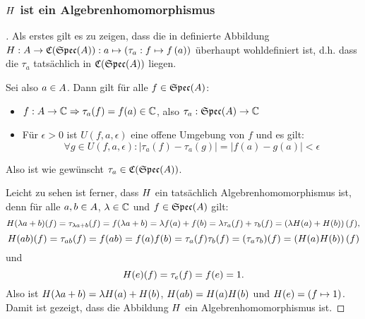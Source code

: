 \subsubsection{$H$ ist ein Algebrenhomomorphismus}\label{sec:Algebrenhomomorphismus}

\begin{proof}[]Als erstes gilt es zu zeigen, dass die in  definierte Abbildung $H: A \to \mathfrak{C}(\mathfrak{Spec}(A)): a \mapsto \left(\tau_a: f \mapsto f\left(a\right)\right)$ überhaupt wohldefiniert ist, d.h. dass die $\tau_a$ tatsächlich in $\mathfrak{C}(\mathfrak{Spec}(A))$ liegen.

Sei also $a \in A$. Dann gilt für alle $f \in \mathfrak{Spec}(A)$:
\begin{itemize}
	\item $f: A \to \mathbb{C} \Rightarrow \tau_a(f) = f(a) \in \mathbb{C}$, also $\tau_a: \mathfrak{Spec}(A) \to \mathbb{C}$
	\item Für $\epsilon > 0$ ist $U(f, a, \epsilon)$ eine offene Umgebung von $f$ und es gilt:
		\[\forall g \in U(f, a, \epsilon): |\tau_a(f) - \tau_a(g)| = |f(a) - g(a)| < \epsilon\]
\end{itemize}
Also ist wie gewünscht $\tau_a \in \mathfrak{C}(\mathfrak{Spec}(A))$.

Leicht zu sehen ist ferner, dass $H$ ein tatsächlich Algebrenhomomorphismus ist, denn für alle $a, b \in A$, $\lambda \in \mathbb{C}$ und $f \in \mathfrak{Spec}(A)$ gilt:
	\[H(\lambda a + b)(f) = \tau_{\lambda a + b}(f) = f(\lambda a + b) = \lambda f(a) + f(b) = \lambda \tau_a(f) + \tau_b(f) = \left(\lambda H(a)+H(b)\right)(f),\]
	\[H(ab)(f) = \tau_{ab}(f) = f(ab) = f(a)f(b) = \tau_a(f)\tau_b(f) = (\tau_a\tau_b)(f) = \left(H(a)H(b)\right)(f)\]
und
	\[H(e)(f) = \tau_e(f) = f(e) = 1.\]
Also ist $H(\lambda a + b) = \lambda H(a) + H(b)$, $H(ab) = H(a)H(b)$ und $H(e) = \left(f \mapsto 1\right)$. Damit ist gezeigt, dass die Abbildung $H$ ein Algebrenhomomorphismus ist.

\let\qed\relax
\end{proof}